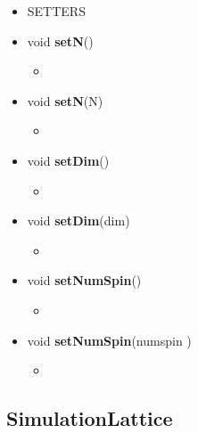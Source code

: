 \documentclass[11pt,a4paper]{article}
\begin{document}
\begin{itemize}
\begin{itemize}
		\item[] SETTERS
			
			\item[] void \textbf{setN}() 	 
			\begin{itemize}
				\item[] 
			\end{itemize}
			
			\item[] void \textbf{setN}(\textunderscore N) 		 
			\begin{itemize}
				\item[] 
			\end{itemize}	
			
			\item[] void \textbf{setDim}()		 
			\begin{itemize}
				\item[] 
			\end{itemize}
			
			\item[] void \textbf{setDim}(\textunderscore dim) 		 
			\begin{itemize}
				\item[] 
			\end{itemize}
			
			\item[] void \textbf{setNumSpin}()		 
			\begin{itemize}
				\item[] 
			\end{itemize}
			
			\item[] void \textbf{setNumSpin}(\textunderscore num\textunderscore spin ) 		 
			\begin{itemize}
				\item[] 
			\end{itemize}
				
	\end{itemize}

	
\end{itemize}


\subsection*{SimulationLattice}
\end{document}
